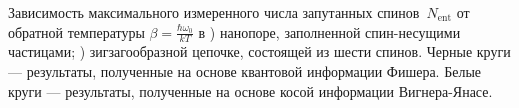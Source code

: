 Зависимость максимального измеренного числа запутанных спинов~$N_\mathrm{ent}$
от обратной температуры $\beta = \frac{\hbar \omega_0}{kT}$
в ) нанопоре, заполненной спин-несущими частицами;
) зигзагообразной цепочке, состоящей из шести спинов.
Черные круги --- результаты, полученные на основе квантовой информации Фишера.
Белые круги --- результаты, полученные на основе косой информации Вигнера-Янасе.